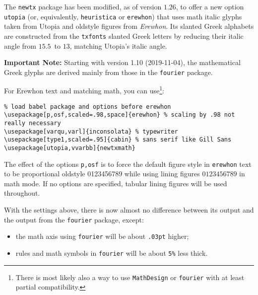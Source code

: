 \documentclass[11pt]{amsart}
\begin{document}
The {\tt newtx} package has been modified, as of version $1.26$,  to offer a new option {\tt utopia} (or, equivalently, {\tt heuristica} or {\tt erewhon}) that uses math italic glyphs taken from Utopia and oldstyle figures from \emph{Erewhon}. Its slanted Greek alphabets are constructed from the {\tt txfonts} slanted Greek letters by reducing their italic angle from $15.5$\textdegree\ to $13$\textdegree, matching Utopia's italic angle. 

\textbf{Important Note:} Starting with version 1.10 (2019-11-04), the mathematical Greek glyphs are derived mainly from those in the {\tt fourier} package.

For Erewhon text and matching math, you can use\footnote{There is most likely also a way to use {\tt MathDesign} or {\tt fourier} with at least partial compatibility.}:
\begin{verbatim}
% load babel package and options before erewhon
\usepackage[p,osf,scaled=.98,space]{erewhon} % scaling by .98 not really necessary
\usepackage[varqu,varl]{inconsolata} % typewriter
\usepackage[type1,scaled=.95]{cabin} % sans serif like Gill Sans
\usepackage[utopia,vvarbb]{newtxmath}
\end{verbatim}
The effect of the options {\tt p,osf} is to force the default figure style in {\tt erewhon} text to be proportional oldstyle 0123456789 while using lining figures $0123456789$ in math mode. If no options are specified, tabular lining figures will be used throughout.

With the settings above, there is now almost no difference between its output and the output from the {\tt fourier} package, except:
\begin{itemize}
\item
the math axis using {\tt fourier} will be about {\tt .03pt} higher;
\item rules and math symbols in {\tt fourier} will be about \verb|5%| less thick.
\end{itemize}
\end{document}
